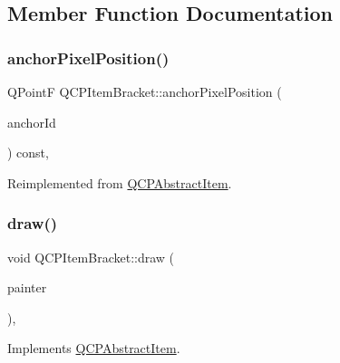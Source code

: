 \subsection{Member Function Documentation}
\mbox{\label{class_q_c_p_item_bracket_a008d87325d26b6616d368cec06027cce}} 
\subsubsection{\texorpdfstring{anchor\+Pixel\+Position()}{anchorPixelPosition()}}
{\footnotesize\ttfamily Q\+PointF Q\+C\+P\+Item\+Bracket\+::anchor\+Pixel\+Position (\begin{DoxyParamCaption}\item[{int}]{anchor\+Id }\end{DoxyParamCaption}) const\hspace{0.3cm}{\ttfamily [protected]}, {\ttfamily [virtual]}}



Reimplemented from \hyperlink{class_q_c_p_abstract_item_ada5bad4e1196c4fc0d0d12328e24b8f2}{Q\+C\+P\+Abstract\+Item}.

\mbox{\label{class_q_c_p_item_bracket_a942a3978aea44a2fc7b4383f2bf6d417}} 
\subsubsection{\texorpdfstring{draw()}{draw()}}
{\footnotesize\ttfamily void Q\+C\+P\+Item\+Bracket\+::draw (\begin{DoxyParamCaption}\item[{\hyperlink{class_q_c_p_painter}{Q\+C\+P\+Painter} $\ast$}]{painter }\end{DoxyParamCaption})\hspace{0.3cm}{\ttfamily [protected]}, {\ttfamily [virtual]}}



Implements \hyperlink{class_q_c_p_abstract_item_a007fdab79c935a5da5aa04a21d268c18}{Q\+C\+P\+Abstract\+Item}.

\mbox{\label{class_q_c_p_item_bracket_af69dbe7ca5847f36403e1fb502e8e59d}} 

